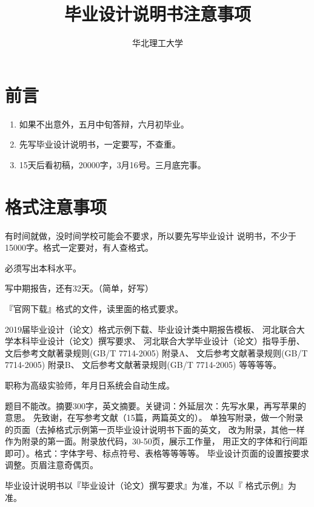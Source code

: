 \documentclass[hazy, normal, blue, 14pt]{elegantnote}
\title{毕业设计说明书注意事项}
\author{华北理工大学}
\begin{document}
\maketitle
\tableofcontents
\newpage

\section{前言}

\begin{enumerate}
    \item 如果不出意外，五月中旬答辩，六月初毕业。
    \item 先写毕业设计说明书，一定要写，不查重。
    \item 15天后看初稿，20000字，3月16号。三月底完事。
\end{enumerate}

\section{格式注意事项}

有时间就做，没时间学校可能会不要求，所以要先写毕业设计
说明书，不少于15000字。格式一定要对，有人查格式。

必须写出本科水平。

写中期报告，还有32天。（简单，好写）

『官网下载』格式的文件，读里面的格式要求。
\begin{note}
    2019届毕业设计（论文）格式示例下载、毕业设计类中期报告模板、
    河北联合大学本科毕业设计（论文）撰写要求、
    河北联合大学毕业设计（论文）指导手册、
    文后参考文献著录规则(GB/T 7714-2005) 附录A、
    文后参考文献著录规则(GB/T 7714-2005) 附录B、
    文后参考文献著录规则(GB/T 7714-2005)
    等等等等。
\end{note}

职称为高级实验师，年月日系统会自动生成。

题目不能改。摘要300字，英文摘要。关键词：外延层次：先写水果，再写苹果的意思。
先致谢，在写参考文献（15篇，两篇英文的）。
单独写附录，做一个附录的页面（去掉格式示例第一页毕业设计说明书下面的英文，
改为附录，其他一样作为附录的第一面。附录放代码，30-50页，展示工作量，
用正文的字体和行间距即可）。格式：字体字号、标点符号、表格等等等等。
毕业设计页面的设置按要求调整。页眉注意奇偶页。

\begin{note}
    毕业设计说明书以『毕业设计（论文）撰写要求』为准，不以『
    格式示例』为准。
\end{note}
\end{document}
